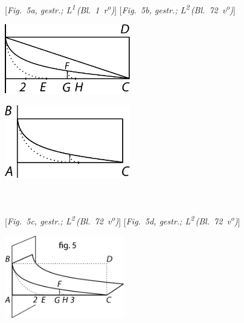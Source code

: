 \\
\\
\hspace*{9mm} [\textit{Fig.~5a, gestr.; L\textsuperscript{1}\,(Bl.~1~r\textsuperscript{o}\!)}] \label{LH_35_09_16_002r_Fig.5a}\hspace*{20mm} [\textit{Fig.~5b, gestr.; L\textsuperscript{2}\,(Bl.~72~v\textsuperscript{o}\!)}] \label{LH_37_03_072v_Fig.5b}
\pend
\vspace{1em}
\pstart 
\hspace{11mm}\begin{minipage}[t]{0.5\textwidth}
\includegraphics[width=0.41\textwidth]{gesamttex/edit_VIII,3/images/dnr-5c_LH_37_03_071-072_d5c.pdf}
\end{minipage}
\hspace{0mm}
\begin{minipage}[t]{0.5\textwidth}
\includegraphics[width=0.41\textwidth]{gesamttex/edit_VIII,3/images/dnr-5d_LH_37_03_071-072_d5d.pdf}
\end{minipage}
\\
\\
\hspace*{9mm} [\textit{Fig.~5c, gestr.; L\textsuperscript{2}\,(Bl.~72~v\textsuperscript{o}\!)}] \label{LH_37_03_072v_Fig.5c}\hspace*{19mm} [\textit{Fig.~5d, gestr.; L\textsuperscript{2}\,(Bl.~72~v\textsuperscript{o}\!)}]\label{LH_37_03_072v_Fig.5d}
\pend
\vspace{1em}
 \centerline{\includegraphics[width=0.39\textwidth]{gesamttex/edit_VIII,3/images/dnr-5e_LH_37_03_071-072+AE_1684_319-325_d5e.pdf}}%
